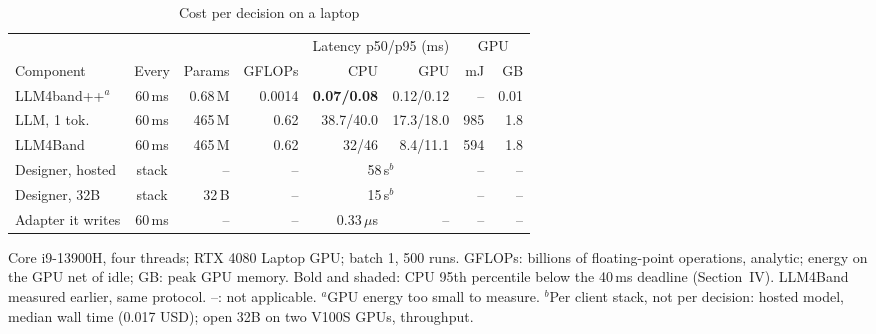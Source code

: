 \begin{table}[t]
\centering
\begin{threeparttable}
\caption{Cost per decision on a laptop}
\label{tab:cost}
\footnotesize
\setlength{\tabcolsep}{2.3pt}
\begin{tabular}{@{}l c r r r r r r@{}}
\toprule
& & & & \multicolumn{2}{c}{Latency p50/p95 (ms)} & \multicolumn{2}{c}{GPU} \\ \cmidrule(lr){5-6}\cmidrule(l){7-8}
Component & Every & Params & GFLOPs & CPU & GPU & mJ & GB \\
\midrule
LLM4band++$^{a}$ & 60\,ms & 0.68\,M & 0.0014 & \cellcolor{favour}\bfseries 0.07/0.08 & 0.12/0.12 & -- & 0.01 \\
LLM, 1 tok. & 60\,ms & 465\,M & 0.62 & 38.7/40.0 & 17.3/18.0 & 985 & 1.8 \\
LLM4Band & 60\,ms & 465\,M & 0.62 & 32/46 & 8.4/11.1 & 594 & 1.8 \\
\midrule
Designer, hosted & stack & -- & -- & \multicolumn{2}{c}{58\,s$^{b}$} & -- & -- \\
Designer, 32B & stack & 32\,B & -- & \multicolumn{2}{c}{15\,s$^{b}$} & -- & -- \\
Adapter it writes & 60\,ms & -- & -- & 0.33\,$\mu$s & -- & -- & -- \\
\bottomrule
\end{tabular}
\begin{tablenotes}\footnotesize
Core i9-13900H, four threads; RTX 4080 Laptop GPU; batch 1, 500 runs. GFLOPs: billions of floating-point operations, analytic; energy on the GPU net of idle; GB: peak GPU memory. Bold and shaded: CPU 95th percentile below the 40\,ms deadline (Section~IV). LLM4Band measured earlier, same protocol. --: not applicable. $^{a}$GPU energy too small to measure. $^{b}$Per client stack, not per decision: hosted model, median wall time (0.017 USD); open 32B on two V100S GPUs, throughput.
\end{tablenotes}
\end{threeparttable}
\end{table}